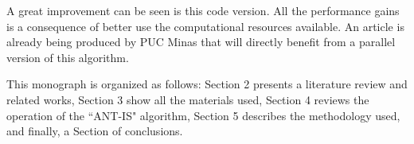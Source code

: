 A great improvement can be seen is this code version. All the performance gains is a consequence of better use the computational resources available. An article is already being produced by PUC Minas that will directly benefit from a parallel version of this algorithm.

This monograph is organized as follows: Section 2 presents a literature review and related works, Section 3 show all the materials used, Section 4 reviews the operation of the ``ANT-IS" algorithm, Section 5 describes the methodology used, and finally, a Section of conclusions.
